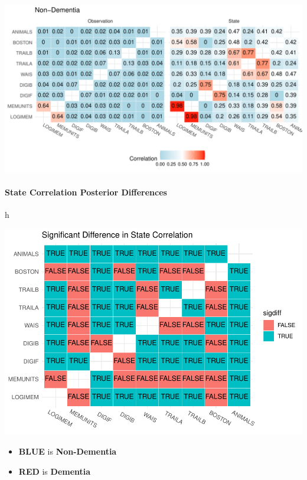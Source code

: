 \documentclass[
]{article}
\providecommand{\tightlist}{%
  \setlength{\itemsep}{0pt}\setlength{\parskip}{0pt}}
\begin{document}
\includegraphics{DataAnalysis_files/figure-latex/unnamed-chunk-5-1.pdf}

\hypertarget{state-correlation-posterior-differences}{%
\paragraph{State Correlation Posterior Differences}\label{state-correlation-posterior-differences}}

h

\includegraphics{DataAnalysis_files/figure-latex/unnamed-chunk-7-1.pdf}

\begin{itemize}
\tightlist
\item
  \textbf{BLUE} is \textbf{Non-Dementia}
\item
  \textbf{RED} is \textbf{Dementia}
\end{itemize}
\end{document}

